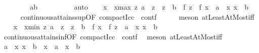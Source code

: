 \begin{isabellebody}
\ \ \ \ \isamarkupfalse%
\ \isamarkupfalse%
\ {\isacharasterisk}{\kern0pt}{\isacharcolon}{\kern0pt}\ {\isachardoublequoteopen}{\isacharbraceleft}{\kern0pt}a{\isachardot}{\kern0pt}{\isachardot}{\kern0pt}b{\isacharbraceright}{\kern0pt}\ {\isasymnoteq}\ {\isacharbraceleft}{\kern0pt}{\isacharbraceright}{\kern0pt}{\isachardoublequoteclose}\isanewline
\ \ \ \ \ \ \isamarkupfalse%
\ auto\isanewline
\ \ \isamarkupfalse%
\ x\ \ x{\isacharunderscore}{\kern0pt}max{\isacharcolon}{\kern0pt}\ {\isachardoublequoteopen}{\isasymforall}z{\isachardot}{\kern0pt}\ a\ {\isasymle}\ z\ {\isasymand}\ z\ {\isasymle}\ b\ {\isasymlongrightarrow}\ f\ z\ {\isasymle}\ f\ x{\isachardoublequoteclose}\ \ {\isachardoublequoteopen}a\ {\isasymle}\ x{\isachardoublequoteclose}\ {\isachardoublequoteopen}x\ {\isasymle}\ b{\isachardoublequoteclose}\isanewline
\ \ \ \ \isamarkupfalse%
\ continuous{\isacharunderscore}{\kern0pt}attains{\isacharunderscore}{\kern0pt}sup{\isacharbrackleft}{\kern0pt}OF\ compact{\isacharunderscore}{\kern0pt}Icc\ {\isacharasterisk}{\kern0pt}\ contf{\isacharbrackright}{\kern0pt}\isanewline
\ \ \ \ \isamarkupfalse%
\ {\isacharparenleft}{\kern0pt}meson\ atLeastAtMost{\isacharunderscore}{\kern0pt}iff{\isacharparenright}{\kern0pt}\isanewline
\ \ \isamarkupfalse%
\ x{\isacharprime}{\kern0pt}\ \ x{\isacharprime}{\kern0pt}{\isacharunderscore}{\kern0pt}min{\isacharcolon}{\kern0pt}\ {\isachardoublequoteopen}{\isasymforall}z{\isachardot}{\kern0pt}\ a\ {\isasymle}\ z\ {\isasymand}\ z\ {\isasymle}\ b\ {\isasymlongrightarrow}\ f\ x{\isacharprime}{\kern0pt}\ {\isasymle}\ f\ z{\isachardoublequoteclose}\ \ {\isachardoublequoteopen}a\ {\isasymle}\ x{\isacharprime}{\kern0pt}{\isachardoublequoteclose}\ {\isachardoublequoteopen}x{\isacharprime}{\kern0pt}\ {\isasymle}\ b{\isachardoublequoteclose}\isanewline
\ \ \ \ \isamarkupfalse%
\ continuous{\isacharunderscore}{\kern0pt}attains{\isacharunderscore}{\kern0pt}inf{\isacharbrackleft}{\kern0pt}OF\ compact{\isacharunderscore}{\kern0pt}Icc\ {\isacharasterisk}{\kern0pt}\ contf{\isacharbrackright}{\kern0pt}\ \isamarkupfalse%
\ {\isacharparenleft}{\kern0pt}meson\ atLeastAtMost{\isacharunderscore}{\kern0pt}iff{\isacharparenright}{\kern0pt}\isanewline
\ \ \isamarkupfalse%
\ {\isachardoublequoteopen}a\ {\isacharless}{\kern0pt}\ x{\isachardoublequoteclose}\ {\isachardoublequoteopen}x\ {\isacharless}{\kern0pt}\ b{\isachardoublequoteclose}\ {\isacharbar}{\kern0pt}\ {\isachardoublequoteopen}x\ {\isacharequal}{\kern0pt}\ a\ {\isasymor}\ x\ {\isacharequal}{\kern0pt}\ b{\isachardoublequoteclose}\isanewline

\end{isabellebody}
